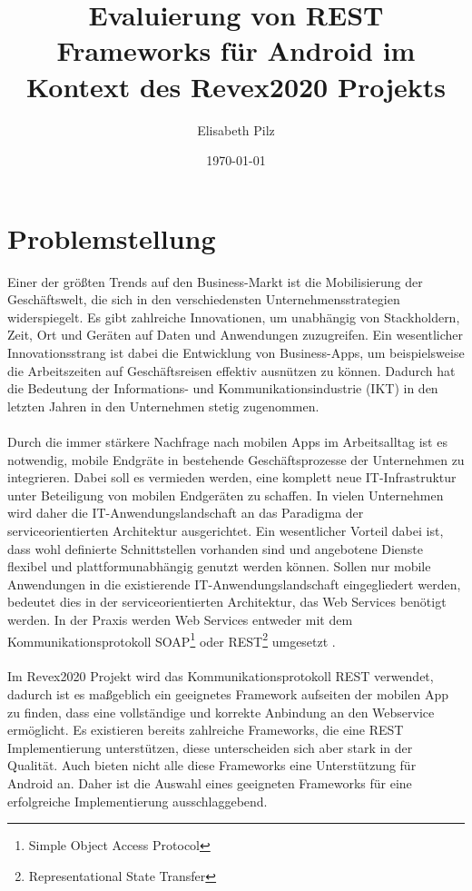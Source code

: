 \documentclass[a4paper,11pt,german,public]{INSOexpose}
\title{\centering Evaluierung von REST Frameworks für Android im Kontext des Revex2020 Projekts\\}
\author{Elisabeth Pilz}
\date{\today}
\begin{document}
\maketitle
{}
\section{Problemstellung}

Einer der größten Trends auf den Business-Markt ist die Mobilisierung der Geschäftswelt, die sich in den verschiedensten Unternehmensstrategien widerspiegelt. Es gibt zahlreiche Innovationen, um unabhängig von Stackholdern, Zeit, Ort und Geräten auf Daten und Anwendungen zuzugreifen. Ein wesentlicher Innovationsstrang ist dabei die Entwicklung von Business-Apps, um beispielsweise die Arbeitszeiten auf Geschäftsreisen effektiv ausnützen zu können. Dadurch hat die Bedeutung der Informations- und Kommunikationsindustrie (IKT) in den letzten Jahren in den Unternehmen stetig zugenommen\cite{smartMobileApps1}.
\\\\
Durch die immer stärkere Nachfrage nach mobilen Apps im Arbeitsalltag ist es notwendig, mobile Endgräte in bestehende Geschäftsprozesse der Unternehmen zu integrieren. Dabei soll es vermieden werden, eine komplett neue IT-Infrastruktur unter Beteiligung von mobilen Endgeräten zu schaffen. In vielen Unternehmen wird daher die IT-Anwendungslandschaft an das Paradigma der serviceorientierten Architektur ausgerichtet. Ein wesentlicher Vorteil dabei ist, dass wohl definierte Schnittstellen vorhanden sind und angebotene Dienste flexibel und plattformunabhängig genutzt werden können. Sollen nur mobile Anwendungen in die existierende IT-Anwendungslandschaft eingegliedert werden, bedeutet dies in der serviceorientierten Architektur, das Web Services benötigt werden. In der Praxis werden Web Services entweder mit dem Kommunikationsprotokoll SOAP\footnote{Simple Object Access Protocol} oder REST\footnote{Representational State Transfer} umgesetzt \cite{smartMobileApps17}.
\\\\
Im Revex2020 Projekt wird das Kommunikationsprotokoll REST verwendet, dadurch ist es maßgeblich ein geeignetes Framework aufseiten der mobilen App zu finden, dass eine vollständige und korrekte Anbindung an den Webservice ermöglicht. Es existieren bereits zahlreiche Frameworks, die eine REST Implementierung unterstützen, diese unterscheiden sich aber stark in der Qualität. Auch bieten nicht alle diese Frameworks eine Unterstützung für Android an. Daher ist die Auswahl eines geeigneten Frameworks für eine erfolgreiche Implementierung ausschlaggebend. 
\end{document}

